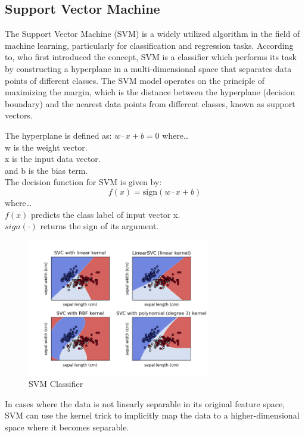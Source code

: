 \documentclass[12pt]{report}
\begin{document}
\subsection*{Support Vector Machine}
The Support Vector Machine (SVM) is a widely utilized algorithm in the field of
machine learning, particularly for classification and regression tasks.
According to\cite{Cortes1995}, who first introduced the concept, SVM is a
classifier which performs its task by constructing a hyperplane in a
multi-dimensional space that separates data points of different classes. The
SVM model operates on the principle of maximizing the margin, which is the
distance between the hyperplane (decision boundary) and the nearest data points
from different classes, known as support vectors.

The hyperplane is defined as: \( w \cdot x + b = 0 \) where\dots\\ w is the
weight vector.\\ x is the input data vector.\\ and b is the bias term.\\

The decision function for SVM is given by: \[ f(x)=\mathrm{sign}(w \cdot x + b) \] where\dots \\ $f(x)$ predicts the class label of input vector x.\\
$sign(\cdot)$ returns the sign of its argument.\\

\begin{figure}[ht]
    \centering
    \includegraphics[width=8cm]{./figures/images (4).png}
    \caption{SVM Classifier}\label{fig:fig1}
\end{figure}

In cases where the data is not linearly separable in its original feature
space, SVM can use the kernel trick to implicitly map the data to a
higher-dimensional space where it becomes separable.
\end{document}
